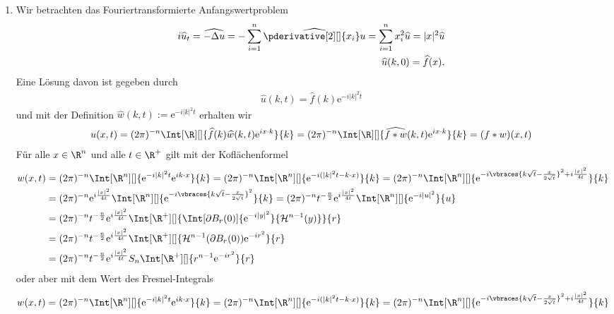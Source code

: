 \begin{solution}
	\phantom{}
	\begin{enumerate}[label = (\roman*)]
		\item Wir betrachten das Fouriertransformierte Anfangswertproblem
			\begin{align*}
			i \widehat{u}_t = \widehat{- \Delta u} = - \sum_{i = 1}^n \widehat{\pderivative[2][]{x_i}u} = \sum_{i = 1}^n x_i^2 \widehat{u} = |x|^2 \widehat{u} \\
			\widehat{u}(k,0) = \widehat{f}(x).
			\end{align*}
			Eine Lösung davon ist gegeben durch
			\begin{align*}
			\widehat{u}(k,t) = \widehat{f}(k) \mathrm{e}^{-i|k|^2t}
			\end{align*}
			und mit der Definition $\widehat{w}(k,t) := \mathrm{e}^{-i|k|^2t}$ erhalten wir
			\begin{align*}
			u(x,t) = (2\pi)^{-n} \Int[\R][]{\widehat{f}(k) \widehat{w}(k,t) \mathrm{e}^{i x \cdot k}}{k} = (2\pi)^{-n} \Int[\R][]{\widehat{f \ast w}(k, t) \mathrm{e}^{i x \cdot k}}{k} = (f \ast w)(x,t)
			\end{align*}
			Für alle $x \in \R^n$ und alle $t \in \R^+$ gilt mit der Koflächenformel
			\begin{align*}
			w(x,t) &= (2 \pi)^{-n} \Int[\R^n][]{\mathrm{e}^{- i |k|^2 t} \mathrm{e}^{i k \cdot x}}{k} = (2 \pi)^{-n} \Int[\R^n][]{\mathrm{e}^{- i (|k|^2 t - k \cdot x)}}{k} = (2 \pi)^{-n} \Int[\R^n][]{\mathrm{e}^{- i \vbraces{k \sqrt{t} - \frac{x}{2 \sqrt{t}}}^2 + i\frac{|x|^2}{4t}}}{k} \\
			&= (2 \pi)^{-n} \mathrm{e}^{i\frac{|x|^2}{4t}} \Int[\R^n][]{\mathrm{e}^{- i \vbraces{k \sqrt{t} - \frac{x}{2 \sqrt{t}}}^2}}{k} = (2 \pi)^{-n} t^{-\frac{n}{2}} \mathrm{e}^{i\frac{|x|^2}{4t}} \Int[\R^n][]{\mathrm{e}^{- i|u|^2}}{u} \\
			&= (2 \pi)^{-n} t^{-\frac{n}{2}} \mathrm{e}^{i\frac{|x|^2}{4t}} \Int[\R^+][]{\Int[\partial B_r(0)]{\mathrm{e}^{- i|y|^2}}{\mathcal{H}^{n - 1}(y)}}{r} \\
			&= (2 \pi)^{-n} t^{-\frac{n}{2}} \mathrm{e}^{i\frac{|x|^2}{4t}}  \Int[\R^+][]{\mathcal{H}^{n - 1}(\partial B_r(0))\mathrm{e}^{- ir^2}}{r} \\
			&= (2 \pi)^{-n} t^{-\frac{n}{2}} \mathrm{e}^{i\frac{|x|^2}{4t}} S_n  \Int[\R^+][]{r^{n - 1}\mathrm{e}^{- ir^2}}{r}
			\end{align*}
			oder aber mit dem Wert des Fresnel-Integrals
			\begin{align*}
			w(x,t) &= (2 \pi)^{-n} \Int[\R^n][]{\mathrm{e}^{- i |k|^2 t} \mathrm{e}^{i k \cdot x}}{k} = (2 \pi)^{-n} \Int[\R^n][]{\mathrm{e}^{- i (|k|^2 t - k \cdot x)}}{k} = (2 \pi)^{-n} \Int[\R^n][]{\mathrm{e}^{- i \vbraces{k \sqrt{t} - \frac{x}{2 \sqrt{t}}}^2 + i\frac{|x|^2}{4t}}}{k} \\

\end{align*}
\end{enumerate}
\end{solution}
